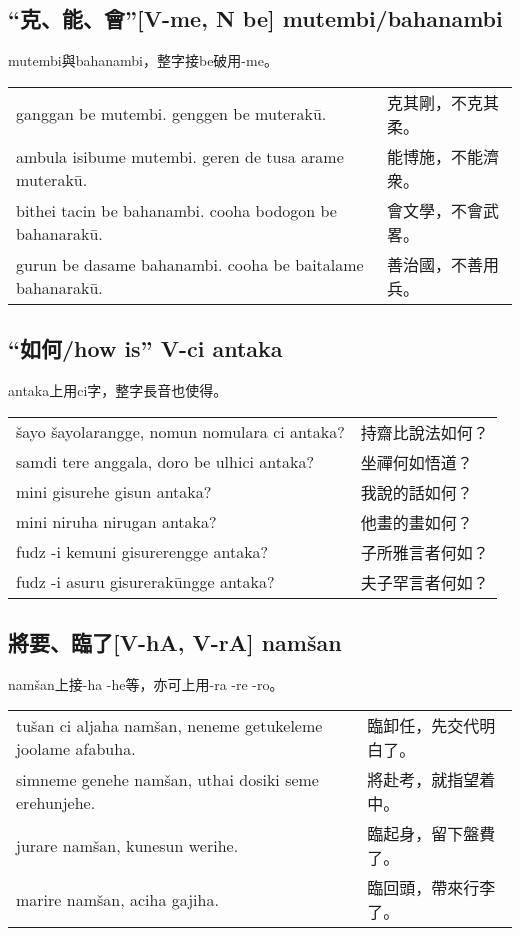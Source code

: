 \documentclass{article}
\begin{document}
\subsection{“克、能、會”[V-me, N be] mutembi/bahanambi}
\noindent mutembi與bahanambi，整字接be破用-me。
\begin{center}
    \begin{tabularx}{\textwidth}{XX}
        ganggan be mutembi. genggen be muterak\={u}. &克其剛，不克其柔。\\
        ambula isibume mutembi. geren de tusa arame muterak\={u}. & 能博施，不能濟衆。\\
        bithei tacin be bahanambi. cooha bodogon be bahanarak\={u}. &會文學，不會武畧。\\
        gurun be dasame bahanambi. cooha be baitalame bahanarak\={u}. & 善治國，不善用兵。
    \end{tabularx}
\end{center}

\subsection{“如何/how is” V-ci antaka}
\noindent antaka上用ci字，整字長音也使得。
\begin{center}
    \begin{tabularx}{\textwidth}{XX}
        \v{s}ayo \v{s}ayolarangge, nomun nomulara ci antaka? & 持齋比說法如何？\\
        samdi tere anggala, doro be ulhici antaka? & 坐禪何如悟道？\\
        mini gisurehe gisun antaka? &我說的話如何？\\
        mini niruha nirugan antaka? &他畫的畫如何？\\
        fudz -i kemuni gisurerengge antaka? &子所雅言者何如？\\
        fudz -i asuru gisurerak\={u}ngge antaka? &夫子罕言者何如？
    \end{tabularx}
\end{center}

\subsection{將要、臨了[V-hA, V-rA] nam\v{s}an}
\noindent nam\v{s}an上接-ha -he等，亦可上用-ra -re -ro。
\begin{center}
    \begin{tabularx}{\textwidth}{XX}
        tu\v{s}an ci aljaha nam\v{s}an, neneme getukeleme joolame afabuha. & 臨卸任，先交代明白了。\\
        simneme genehe nam\v{s}an, uthai dosiki seme erehunjehe. & 將赴考，就指望着中。\\
        jurare nam\v{s}an, kunesun werihe. & 臨起身，留下盤費了。\\
        marire nam\v{s}an, aciha gajiha. & 臨回頭，帶來行李了。
    \end{tabularx}
\end{center}
\end{document}
